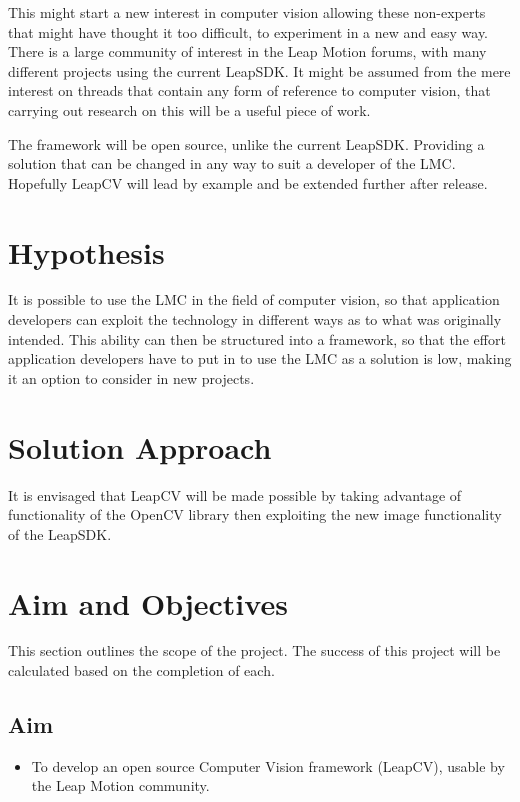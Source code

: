 \documentclass[11pt,oneside]{report}
\begin{document}
				This might start a new interest in computer vision allowing these non-experts that might have thought it too difficult, to experiment in a new and easy way.
				There is a large community of interest in the Leap Motion forums, with many different projects using the current LeapSDK.
				It might be assumed from the mere interest on threads that contain any form of reference to computer vision, that carrying out research on this will be a useful piece of work.
				
				The framework will be open source, unlike the current LeapSDK.
				Providing a solution that can be changed in any way to suit a developer of the LMC.
				Hopefully LeapCV will lead by example and be extended further after release.
		\section{Hypothesis}
				It is possible to use the LMC in the field of computer vision, so that application developers can exploit the technology in different ways as to what was originally intended.	
				This ability can then be structured into a framework, so that the effort application developers have to put in to use the LMC as a solution is low, making it an option to consider in new projects.	
		\section{Solution Approach}	
			It is envisaged that LeapCV will be made possible by taking advantage of functionality of the OpenCV library then exploiting the new image functionality of the LeapSDK.
								
		\section{Aim and Objectives} 
		This section outlines the scope of the project.
		The success of this project will be calculated based on the completion of each.
		\subsection{Aim}
		\begin{itemize}
			\item To develop an open source Computer Vision framework (LeapCV), usable by the Leap Motion community.
		\end{itemize}
\end{document}
